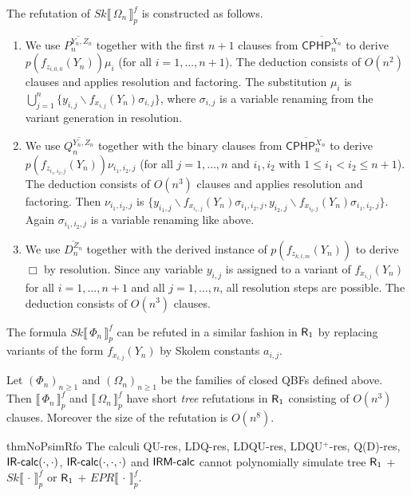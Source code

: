 \documentclass{llncs}
\newcommand{\emptyclause}{\Box}
\newcommand{\qures}{\mbox{\sf QU-res}}
\newcommand{\qdres}{\mbox{\sf Q(D)-res}}
\newcommand{\ldqres}{\mbox{\sf LDQ-res}}
\newcommand{\ldqures}{\mbox{\sf LDQU-res}}
\newcommand{\ldqupres}{\mbox{\sf LDQU{}$^+$-res}}
\newcommand{\Rfo}{$\mbox{\sf R}_1$}
\newcommand{\IRcalcPM}[2]{$\mbox{\sf IR-calc}(#1,#2)$}
\newcommand{\IRcalcPMSubst}[3]{$\mbox{\sf IR-calc}(#1,#2,#3)$}
\newcommand{\IRMcalc}{$\mbox{\sf IRM-calc}$}
\newcommand{\QBFtoPL}[3]{\llbracket\,#1\,\rrbracket_{#2}^{#3}}
\newcommand{\SkQBFtoPL}[3]{\mathit{Sk}\llbracket\,#1\,\rrbracket_{#2}^{#3}}
\newcommand{\EPRQBFtoPL}[3]{\mathit{EPR}\llbracket\,#1\,\rrbracket_{#2}^{#3}}
\newcommand{\PHPText}{CPHP}
\newcommand{\PHPVar}[2]{\mbox{$\mathsf{\PHPText}_{#1}^{#2}$}}
\begin{document}
The refutation of $\SkQBFtoPL{\Omega_n}{p}{f}$ is constructed as
follows.
\begin{enumerate}
\item We use $\overline{P_n^{Y_n,Z_n}}$ together with the first $n+1$
  clauses from $\overline{\PHPVar{n}{X_n}}$ to derive
  $p(f_{z_{i,0,0}}(Y_n))\mu_i$ (for all $i=1,\ldots , n+1$). The
  deduction consists of $O(n^2)$ clauses and applies resolution and
  factoring.  The substitution $\mu_i$ is $\bigcup_{j=1}^n
  \{y_{i,j}\backslash f_{x_{i,j}}(Y_n) \sigma_{i,j}\}$, where
  $\sigma_{i,j}$ is a variable renaming from the variant generation in
  resolution.

\item We use $\overline{Q_n^{Y_n,Z_n}}$ together with the binary
  clauses from $\overline{\PHPVar{n}{X_n}}$ to derive
  $p(f_{z_{i_1,i_2,j}}(Y_n))\nu_{i_1, i_2,j}$ (for all $j=1,\ldots ,
  n$ and $i_1,i_2$ with $1\leq i_1<i_2\leq n+1$).  The deduction
  consists of $O(n^3)$ clauses and applies resolution and factoring.
Then $\nu_{i_1, i_2,j}$ is
  $\{y_{i_1,j}\backslash f_{x_{i_1,j}}(Y_n)\sigma_{i_1, i_2,j},
  y_{i_2,j}\backslash f_{x_{i_2,j}}(Y_n)\sigma_{i_1, i_2,j}\}$. Again
  $\sigma_{i_1, i_2,j}$ is a variable renaming like above.

\item We use $\overline{D_n^{Z_n}}$ together with the derived instance
  of $p(f_{z_{k,l,m}}(Y_n))$ to derive $\emptyclause$ by resolution.
  Since any variable $y_{i,j}$ is assigned to a variant of
  $f_{x_{i,j}}(Y_n)$ for all $i=1,\ldots , n+1$ and all $j=1, \ldots ,
  n$, all resolution steps are possible. The deduction consists of
  $O(n^3)$ clauses.
\end{enumerate}
The formula $\SkQBFtoPL{\Phi_n}{p}{f}$ can be refuted in a similar
fashion in \Rfo{} by replacing variants of the form $f_{x_{i,j}}(Y_n)$
by Skolem constants $a_{i,j}$.

\begin{proposition}\label{prop:Psi_n-short}
Let $(\Phi_n)_{n\geq 1}$ and $(\Omega_n)_{n\geq 1}$ be the families of
closed QBFs defined above.
Then $\QBFtoPL{\Phi_n}{p}{f}$ and $\QBFtoPL{\Omega_n}{p}{f}$ have short
\emph{tree} refutations in \Rfo{} consisting of $O(n^3)$
clauses. Moreover the size of the refutation is $O(n^8)$.
\end{proposition}

\begin{restatable}{thm}{NoPsimRfo}
\label{thm:usual-calculi-npsim-Rfo}
The calculi \qures, \ldqres, \ldqures, \ldqupres{}, \qdres,
\IRcalcPM{\cdot}{\cdot}, \IRcalcPMSubst{\cdot}{\cdot}{\cdot}{} and
\IRMcalc{} cannot polynomially simulate tree \Rfo{} $+$ 
$\SkQBFtoPL{\cdot}{p}{f}$ or \Rfo{} $+$ $\EPRQBFtoPL{\cdot}{p}{f}$.
\end{restatable}
\end{document}
